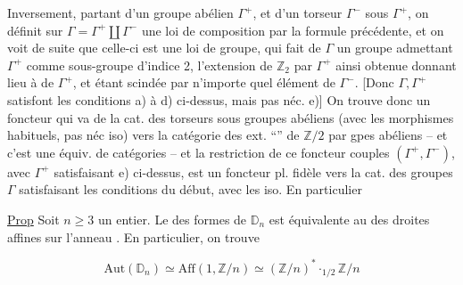 Inversement, partant d'un groupe abélien $\Gamma^+$,
et d'un torseur $\Gamma^-$ sous $\Gamma^+$, on définit sur
$\Gamma=\Gamma^+\amalg\Gamma^-$ une  loi de composition
par la formule précédente, et on voit de
suite que celle-ci est une loi de groupe, qui
fait de $\Gamma$ un groupe admettant $\Gamma^+$ comme
sous-groupe  d'indice 2, l'extension de $\mathbb Z_2$ par
$\Gamma^+$ ainsi obtenue donnant lieu à  
de $\Gamma^+$, et étant scindée par n'importe quel élément
de $\Gamma^-$. [Donc $\Gamma,\Gamma^+$ satisfont les conditions a) à d)
ci-dessus, mais pas néc. e)] On trouve
donc un foncteur qui va de la cat. des
 torseurs sous groupes abéliens (avec les
morphismes habituels, pas néc iso) vers la catégorie
des ext. ``'' de $\mathbb Z/2$ par gpes abéliens
-- et c'est une équiv. de catégories -- et la
restriction de ce foncteur   couples
$(\Gamma^+,\Gamma^-)$, avec $\Gamma^+$ satisfaisant e) ci-dessus,  est un
foncteur pl. fidèle vers la cat. des
groupes $\Gamma$ satisfaisant les conditions du début,
avec les iso. En particulier

\uline{Prop} Soit $n\geq3$ un entier. Le  des formes de
$\mathbb D_n$ est équivalente au  des droites
affines sur l'anneau . En particulier, on
trouve

\[
\mathrm{Aut}(\mathbb D_n)\simeq\mathrm{Aff}(1,\mathbb Z/n)\simeq(\mathbb Z/n)^*\mathbin{\cdot_{1/2}}\mathbb Z/n
\]

